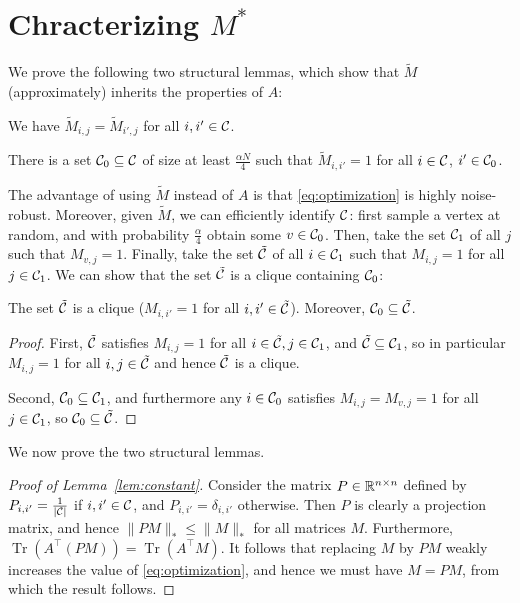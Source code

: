 \documentclass[11pt]{article}
\DeclareMathOperator{\Tr}{Tr}
\newcommand{\M}{\tilde{M}}
\begin{document}
\section{Chracterizing $M^*$}
We prove the following two structural lemmas, which show that 
$\M$ (approximately) inherits the properties of $A$:
\begin{lemma}
\label{lem:constant}
We have $\M_{i,j} = \M_{i',j}$ for all $i,i' \in \mathcal{C}$.
\end{lemma}

\begin{lemma}
\label{lem:ones}
There is a set $\mathcal{C}_0 \subseteq \mathcal{C}$ of size at least 
$\frac{\alpha N}{4}$ such that 
$\M_{i,i'} = 1$ for all $i \in \mathcal{C}$, $i' \in \mathcal{C}_0$.
\end{lemma}
The advantage of using $\M$ instead of $A$ is that \eqref{eq:optimization} is highly 
noise-robust. Moreover, given $\M$, we can efficiently identify $\mathcal{C}$: first sample 
a vertex at random, and with probability $\frac{\alpha}{4}$ obtain some $v \in \mathcal{C}_0$. 
Then, take the set $\mathcal{C}_1$ of all $j$ such that $M_{v,j} = 1$. Finally, take the set 
$\tilde{\mathcal{C}}$ of all $i \in \mathcal{C}_1$ such that $M_{i,j} = 1$ for all $j \in \mathcal{C}_1$. 
We can show that the set $\tilde{\mathcal{C}}$ is a clique containing $\mathcal{C}_0$:
\begin{lemma}
\label{lem:clique}
The set $\tilde{\mathcal{C}}$ is a clique ($M_{i,i'} = 1$ for all $i,i' \in \tilde{\mathcal{C}}$). 
Moreover, $\mathcal{C}_0 \subseteq \tilde{\mathcal{C}}$.
\end{lemma}
\begin{proof}
First, $\tilde{\mathcal{C}}$ satisfies $M_{i,j} = 1$ for all $i \in \tilde{\mathcal{C}}, j \in \mathcal{C}_1$, 
and $\tilde{\mathcal{C}} \subseteq \mathcal{C}_1$, so in particular $M_{i,j} = 1$ for all $i,j \in \tilde{\mathcal{C}}$ 
and hence $\tilde{\mathcal{C}}$ is a clique.

Second, $\mathcal{C}_0 \subseteq \mathcal{C}_1$, and furthermore any $i \in \mathcal{C}_0$ satisfies 
$M_{i,j} = M_{v,j} = 1$ for all $j \in \mathcal{C}_1$, so $\mathcal{C}_0 \subseteq \tilde{\mathcal{C}}$.
\end{proof}

We now prove the two structural lemmas.
\begin{proof}[Proof of Lemma~\ref{lem:constant}]
Consider the matrix $P \in \mathbb{R}^{n \times n}$ defined by 
$P_{i,i'} = \frac{1}{|\mathcal{C}|}$ if $i,i' \in \mathcal{C}$, and 
$P_{i,i'} = \delta_{i,i'}$ otherwise. Then $P$ is clearly a 
projection matrix, and hence $\|PM\|_* \leq \|M\|_*$ for all 
matrices $M$. Furthermore, $\Tr(A^{\top}(PM)) = \Tr(A^{\top}M)$. 
It follows that replacing $M$ by $PM$ weakly increases the value of 
\eqref{eq:optimization}, and hence we must have $M = PM$, from which 
the result follows.
\end{proof}
\end{document}

